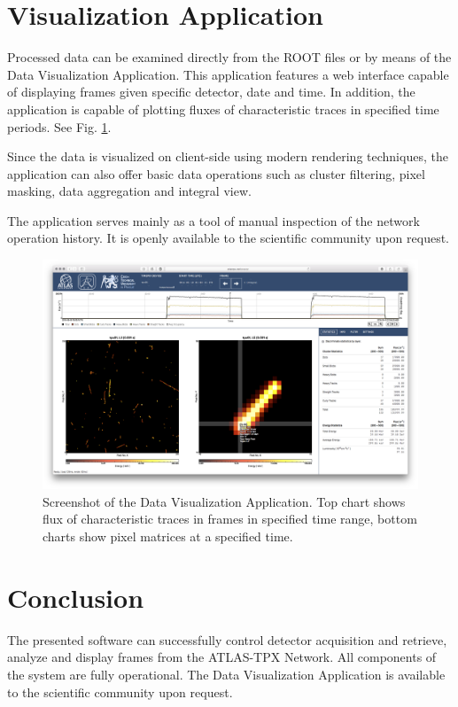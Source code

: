 \documentclass[journal]{IEEEtran}
\begin{document}
\section{\label{sec:dal}Visualization Application}
Processed data can be examined directly from the ROOT files or by means of the Data Visualization Application. \cite{Manek2016} This application features a web interface capable of displaying frames given specific detector, date and time. In addition, the application is capable of plotting fluxes of characteristic traces in specified time periods. See Fig. \ref{fig:positions}.

Since the data is visualized on client-side using modern rendering techniques, the application can also offer basic data operations such as cluster filtering, pixel masking, data aggregation and integral view.

The application serves mainly as a tool of manual inspection of the network operation history. It is openly available to the scientific community upon request.

\begin{figure}[tbp]
	\centering
        \includegraphics[clip, width=.45\textwidth, angle = 0 ]{Plots/screen-tpx01-crosshair-zoomed.png}
	  \caption {Screenshot of the Data Visualization Application. \cite{Manek2016} Top chart shows flux of characteristic traces in frames in specified time range, bottom charts show pixel matrices at a specified time.}
    \label{fig:positions}
\end{figure}

\section{\label{sec:conclusion}Conclusion}
The presented software can successfully control detector acquisition and retrieve, analyze and display frames from the ATLAS-TPX Network. All components of the system are fully operational. The Data Visualization Application is  available to the scientific community upon request.


%

%
\end{document}
